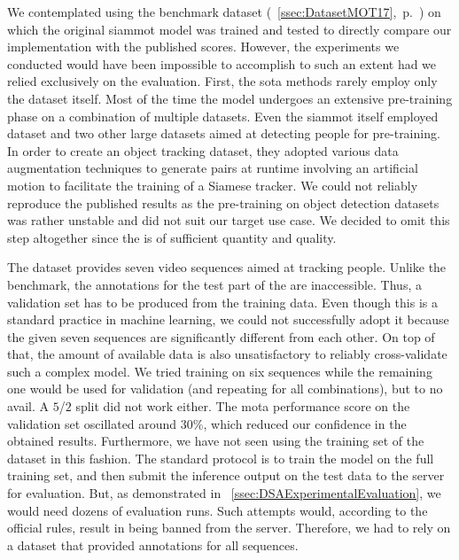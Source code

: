 We contemplated using the \motseventeen{} benchmark dataset (\sectiontext{}~\ref{ssec:DatasetMOT17},~p.~\pageref{ssec:DatasetMOT17}) on which the original \gls{siammot} model was trained and tested to directly compare our implementation with the published scores. However, the experiments we conducted would have been impossible to accomplish to such an extent had we relied exclusively on the \motseventeen{} evaluation. First, the \gls{sota} methods rarely employ only the \motseventeen{} dataset itself. Most of the time the model undergoes an extensive pre-training phase on a combination of multiple datasets. Even the \gls{siammot} itself employed \mscoco{} dataset and two other large datasets aimed at detecting people for pre-training. In order to create an object tracking dataset, they adopted various data augmentation techniques to generate pairs at runtime involving an artificial motion to facilitate the training of a Siamese tracker. We could not reliably reproduce the published results as the pre-training on object detection datasets was rather unstable and did not suit our target use case. We decided to omit this step altogether since the \uadetrac{} is of sufficient quantity and quality.

The \motseventeen{} dataset provides seven video sequences aimed at tracking people. Unlike the \uadetrac{} benchmark, the annotations for the test part of the \motseventeen{} are inaccessible. Thus, a validation set has to be produced from the training data. Even though this is a standard practice in machine learning, we could not successfully adopt it because the given seven sequences are significantly different from each other. On top of that, the amount of available data is also unsatisfactory to reliably cross-validate such a complex model. We tried training on six sequences while the remaining one would be used for validation (and repeating for all combinations), but to no avail. A $5$/$2$ split did not work either. The \gls{mota} performance score on the validation set oscillated around $30$\%, which reduced our confidence in the obtained results. Furthermore, we have not seen using the training set of the \motseventeen{} dataset in this fashion. The standard protocol is to train the model on the full training set, and then submit the inference output on the test data to the server for evaluation. But, as demonstrated in \sectiontext{}~\ref{ssec:DSAExperimentalEvaluation}, we would need dozens of evaluation runs. Such attempts would, according to the official rules, result in being banned from the server. Therefore, we had to rely on a dataset that provided annotations for all sequences.

